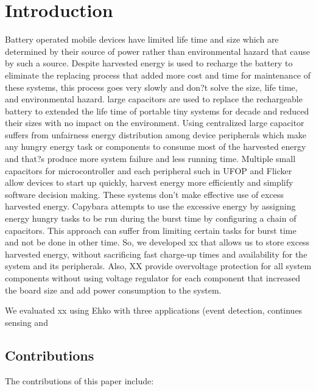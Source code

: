
\section{Introduction}
\label{sec:intro}
Battery operated mobile devices have limited life time and size which are determined by their source of power rather than environmental hazard that cause by such a source. Despite harvested energy is used to recharge the battery to eliminate the replacing process that added more cost and time for maintenance of these systems, this process goes very slowly and don?t solve the size, life time, and environmental hazard. large capacitors are used to replace the rechargeable battery to extended the life time of portable tiny systems for decade and reduced their sizes with no impact on the environment. Using centralized large capacitor suffers from unfairness energy distribution among device peripherals which make any hungry energy task or components to consume most of the harvested energy and that?s produce more system failure and less running time.  
Multiple small capacitors for microcontroller and each peripheral such in UFOP and Flicker allow devices to start up quickly, harvest energy more efficiently and simplify software decision making. These systems don't make effective use of excess harvested energy. Capybara attempts to use the excessive energy by assigning energy hungry tasks to be run during the burst time by configuring a chain of capacitors. This approach can suffer from limiting certain tasks for burst time and not be done in other time. So, we developed xx that allows us to store excess harvested energy, without sacrificing fast charge-up times and availability for the system and its peripherals. Also, XX  provide overvoltage protection for all system components without using voltage regulator for each component that increased the board size and add power consumption to the system. 

We evaluated xx  using Ehko with three applications (event detection, continues sensing and 



\subsection*{Contributions}

The contributions of this paper include:

\begin{compactenum}
	\item 
	\item 
	\item 
\end{compactenum}

\noind
\sysname 